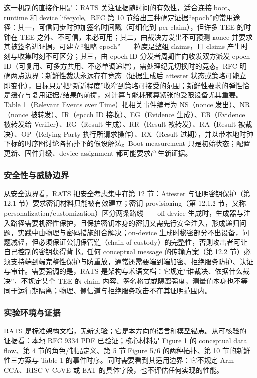 \documentclass[11pt]{ctexart}
\begin{document}
这一机制的直接作用是：RATS 关注证据随时间的有效性，适合连接 boot、runtime 和 device lifecycle。RFC 第 10 节给出三种确定证据“epoch”的常用途径：其一，可信同步时钟加签名时间戳（可细化到 per-claim），但许多 TEE 的时钟在 TEE 之外、不可信，未必可用；其二，由裁决方发出不可预测 nonce 并要求其被签名进证据，可建立“粗略 epoch”——粒度是整组 claims，且 claims 产生时刻与收集时刻不可区分；其三，由 epoch ID 分发者周期性向收发双方派发 epoch ID（可复用、可多方共用、不必单调递增），需处理纪元切换时的竞态。RFC 明确两点边界：新鲜性裁决永远存在竞态（证据生成后 attester 状态或策略可能立即变化），目标只是把“新近程度”收窄到策略可接受的范围；新鲜性要求的弹性恰是缓存与复用证据/结果的前提，对计算与能耗预算紧张的受限设备尤其重要。Table 1（Relevant Events over Time）把相关事件编号为 NS（nonce 发出）、NR（nonce 被转发）、IR（epoch ID 接收）、EG（Evidence 生成）、ER（Evidence 被转发给 Verifier）、RG（Result 生成）、RR（Result 被转发）、RA（Result 被裁决）、OP（Relying Party 执行所请求操作）、RX（Result 过期），并以带本地时钟下标的时序图讨论各拓扑下的假设解法。Boot measurement 只是初始状态；配置更新、固件升级、device assignment 都可能要求产生新证据。\par
\subsubsection{安全性与威胁边界}
从安全边界看，RATS 把安全考虑集中在第 12 节：Attester 与证明密钥保护（第 12.1 节）要求密钥材料只能被有效建立；密钥 provisioning（第 12.1.2 节，又称 personalization/customization）区分两条路线——off-device 生成时，生成器与注入路径需要机密性保护，且保护密钥本身的密钥又需先行安全注入，形成递归问题，实践中由物理与密码措施组合解决；on-device 生成时秘密部分不出设备，问题减轻，但必须保证公钥保管链（chain of custody）的完整性，否则攻击者可让自己控制的密钥获得背书。任何 conceptual message 的传输方案（第 12.2 节）必须支持端到端完整性保护与防重放，通常还需要端到端加密、拒绝服务防护、认证与审计。需要强调的是，RATS 是架构与术语文档：它规定“谁裁决、依据什么裁决”，不规定某个 TEE 的 claim 内容、签名格式或隔离强度，测量值本身也不等同于运行期隔离；物理、侧信道与拒绝服务攻击不在其证明范围内。\par
\subsubsection{实验环境与证据}
RATS 是标准架构文档，无新实验；它是本方向的语言和模型锚点。从可核验的证据看：本地 RFC 9334 PDF 已验证；核心材料是 Figure 1 的 conceptual data flow、第 4 节的角色/制品定义、第 5 节 Figure 5/6 的两种拓扑、第 10 节的新鲜性三方案与 Table 1 的事件时序。同时需要看到其适用边界：它不规定 Arm CCA、RISC-V CoVE 或 EAT 的具体字段，也不评估任何实现的性能。\par
\end{document}
